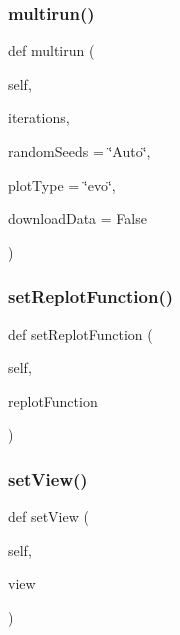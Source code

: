 \subsubsection{\texorpdfstring{multirun()}{multirun()}}
{\footnotesize\ttfamily def multirun (\begin{DoxyParamCaption}\item[{}]{self,  }\item[{}]{iterations,  }\item[{}]{random\+Seeds = {\ttfamily \char`\"{}Auto\char`\"{}},  }\item[{}]{plot\+Type = {\ttfamily \char`\"{}evo\char`\"{}},  }\item[{}]{download\+Data = {\ttfamily False} }\end{DoxyParamCaption})}

\mbox{\label{class_mu_mo_t_1_1_mu_mo_tcontroller_aafc1e69cab41071217fe6676a8089249}} 
\subsubsection{\texorpdfstring{set\+Replot\+Function()}{setReplotFunction()}}
{\footnotesize\ttfamily def set\+Replot\+Function (\begin{DoxyParamCaption}\item[{}]{self,  }\item[{}]{replot\+Function }\end{DoxyParamCaption})}

\mbox{\label{class_mu_mo_t_1_1_mu_mo_tcontroller_a40e22e664ecb6e379377ee1cea60073c}} 
\subsubsection{\texorpdfstring{set\+View()}{setView()}}
{\footnotesize\ttfamily def set\+View (\begin{DoxyParamCaption}\item[{}]{self,  }\item[{}]{view }\end{DoxyParamCaption})}

